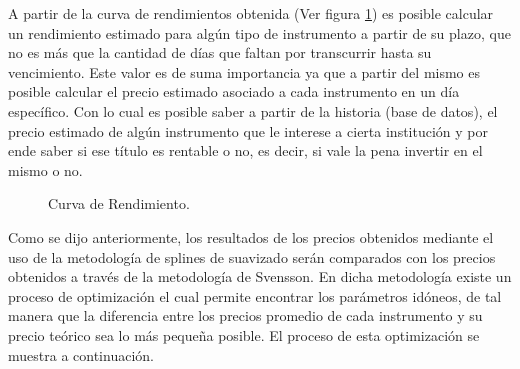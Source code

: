 \hspace{0.4cm} A partir de la curva de rendimientos obtenida (Ver figura \ref{c_rend}) es posible calcular un rendimiento estimado para alg\'un tipo de instrumento a partir de su plazo, que no es m\'as que la cantidad de d\'ias que faltan por transcurrir hasta su vencimiento. Este valor es de suma importancia ya que a partir del mismo es posible calcular el precio estimado asociado a cada instrumento en un d\'ia espec\'ifico. Con lo cual es posible saber a partir de la historia (base de datos), el precio estimado de alg\'un instrumento que le interese a cierta instituci\'on y por ende saber si ese t\'itulo es rentable o no, es decir, si vale la pena invertir en el mismo o no.

\begin{figure}[h]
\caption{Curva de Rendimiento.}
\label{c_rend}
\end{figure}

\hspace{0.4cm} Como se dijo anteriormente, los resultados de los precios obtenidos mediante el uso de la metodolog\'ia de splines de suavizado ser\'an comparados con los precios obtenidos a trav\'es de la metodolog\'ia de Svensson. En dicha metodolog\'ia existe un proceso de optimizaci\'on el cual permite encontrar los par\'ametros id\'oneos, de tal manera que la diferencia entre los precios promedio de cada instrumento y su precio te\'orico sea lo m\'as peque\~na posible. El proceso de esta optimizaci\'on se muestra a continuaci\'on.


